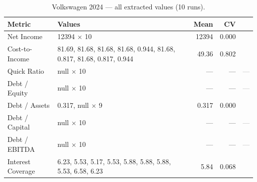 \documentclass[12pt, a4paper]{article}
\newcommand{\cmark}{\textcolor{green!60!black}{\ding{51}}}  %
\newcommand{\xmark}{\textcolor{red!70!black}{\ding{55}}}    %
\newcommand{\nmark}{\textcolor{gray}{---}}                   %
\begin{document}
\begin{table}[H]
\centering\small
\caption{Volkswagen 2024 --- all extracted values (10 runs).}
\label{tab:vw-raw}
\begin{tabular}{lp{8.5cm}rrc}
\toprule
\textbf{Metric} & \textbf{Values} & \textbf{Mean} & \textbf{CV} & \\
\midrule
Net Income         & 12394 $\times$ 10                                                 & 12394 & 0.000 & \cmark \\
Cost-to-Income     & 81.69, 81.68, 81.68, 81.68, 0.944, 81.68, 0.817, 81.68, 0.817, 0.944 & 49.36 & 0.802 & \xmark \\
Quick Ratio        & null $\times$ 10                                                  &  ---  &  ---  & \nmark \\
Debt / Equity      & null $\times$ 10                                                  &  ---  &  ---  & \nmark \\
Debt / Assets      & 0.317, null $\times$ 9                                            & 0.317 & 0.000 & \xmark \\
Debt / Capital     & null $\times$ 10                                                  &  ---  &  ---  & \nmark \\
Debt / EBITDA      & null $\times$ 10                                                  &  ---  &  ---  & \nmark \\
Interest Coverage  & 6.23, 5.53, 5.17, 5.53, 5.88, 5.88, 5.88, 5.53, 6.58, 6.23     &  5.84 & 0.068 & \xmark \\
\bottomrule
\end{tabular}
\end{table}
\end{document}
